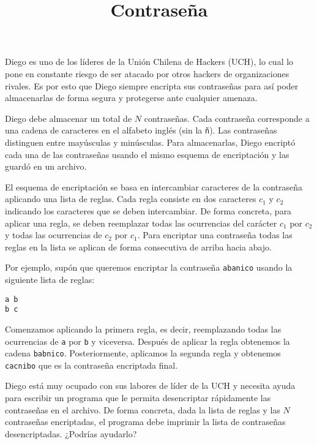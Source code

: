 \documentclass{oci}
\title{Contraseña}
\begin{document}
\begin{problemDescription}
  Diego es uno de los líderes de la Unión Chilena de Hackers (UCH), lo cual lo pone
  en constante riesgo de ser atacado por otros hackers de organizaciones rivales.
  Es por esto que Diego siempre encripta sus contraseñas para así poder almacenarlas de
  forma segura y protegerse ante cualquier amenaza.

  Diego debe almacenar un total de $N$ contraseñas.
  Cada contraseña corresponde a una cadena de caracteres en el alfabeto inglés
  (sin la \texttt{ñ}).
  Las contraseñas distinguen entre mayúsculas y minúsculas.
  Para almacenarlas, Diego encriptó cada una de las contraseñas usando el mismo
  esquema de encriptación y las guardó en un archivo.

  El esquema de encriptación se basa en intercambiar caracteres de la contraseña
  aplicando una lista de reglas.
  Cada regla consiste en dos caracteres $c_1$ y $c_2$ indicando los caracteres
  que se deben intercambiar.
  De forma concreta, para aplicar una regla, se deben reemplazar todas las ocurrencias
  del carácter $c_1$ por $c_2$ y todas las ocurrencias de $c_2$ por $c_1$.
  Para encriptar una contraseña todas las reglas en la lista se aplican de forma consecutiva
  de arriba hacia abajo.

  Por ejemplo, supón que queremos encriptar la contraseña \texttt{abanico} usando la siguiente
  lista de reglas:
\begin{center}
\texttt{a b} \\
\texttt{b c}
\end{center}
  Comenzamos aplicando la primera regla, es decir, reemplazando todas las ocurrencias de
  \texttt{a} por \texttt{b} y viceversa.
  Después de aplicar la regla obtenemos la cadena \texttt{babnico}.
  Posteriormente, aplicamos la segunda regla y obtenemos \texttt{cacnibo} que es la contraseña
  encriptada final.

  Diego está muy ocupado con sus labores de líder de la UCH y necesita ayuda para escribir un
  programa que le permita desencriptar rápidamente las contraseñas en el archivo.
  De forma concreta, dada la lista de reglas y las $N$ contraseñas encriptadas, el programa
  debe imprimir la lista de contraseñas desencriptadas.
  ¿Podrías ayudarlo?
\end{problemDescription}
\end{document}
